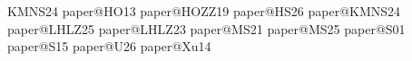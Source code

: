 \documentclass[justified,notoc,twoside,nobib,nofonts]{tufte-handout}
\makeatletter
\newcommand{\paperreference}[1]{\csname paper@#1\endcsname}
\makeatother
\begin{document}
\newpage
\begingroup
\fontsize{10}{12}\selectfont
\setlength{\bibsep}{5pt}
\begin{thebibliography}{KMNS24}
\paperreference{HO13}
\paperreference{HOZZ19}
\paperreference{HS26}
\paperreference{KMNS24}
\paperreference{LHLZ25}
\paperreference{LHLZ23}
\paperreference{MS21}
\paperreference{MS25}
\paperreference{S01}
\paperreference{S15}
\paperreference{U26}
\paperreference{Xu14}
\end{thebibliography}
\endgroup
\end{document}
